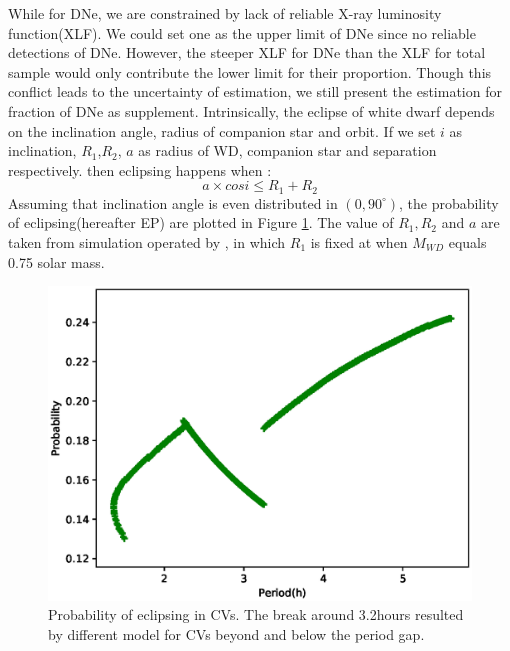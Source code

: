 \documentclass[fleqn,usenatbib]{mnras}
\begin{document}
While for DNe, we are constrained by lack of reliable X-ray luminosity function(XLF). We could set one as the upper limit of DNe since no reliable detections of DNe. However, the steeper XLF for DNe than the XLF for total sample would only contribute the lower limit for their proportion. Though this conflict leads to the uncertainty of estimation,  we still present the estimation for fraction of DNe as supplement.
Intrinsically, the eclipse of white dwarf depends on the inclination angle, radius of companion star and orbit. If we set $i$ as inclination, $R_1$,$R_2$, $a$ as radius of WD, companion star and separation respectively. then eclipsing happens when :
\begin{equation}
{a \times cosi}\leq { R_1+R_2}
\end{equation}
Assuming that inclination angle is even distributed in $(0,90^\circ)$, the probability of eclipsing(hereafter EP) are plotted in Figure \ref{fig:simpCV}. The value of $R_1, R_2$ and $a$ are taken from simulation operated by \citep{2011ApJS..194...28K}, in which $R_1$ is fixed at when $M_{WD}$ equals 0.75 solar mass.
\begin{figure}
\centering
\includegraphics[scale=0.55]{./figure/p_inCV.eps}
\caption{Probability of eclipsing in CVs. The break around 3.2hours resulted by different model for CVs beyond and below the period gap.\label{fig:simpCV}}
\end{figure}
\end{document}
